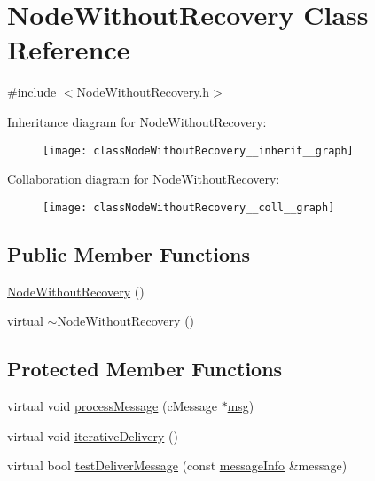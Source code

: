 \hypertarget{classNodeWithoutRecovery}{}\section{Node\+Without\+Recovery Class Reference}
\label{classNodeWithoutRecovery}


{\ttfamily \#include $<$Node\+Without\+Recovery.\+h$>$}



Inheritance diagram for Node\+Without\+Recovery\+:\nopagebreak
\begin{figure}[H]
\begin{center}
\leavevmode
\texttt{[image: classNodeWithoutRecovery\_\_inherit\_\_graph]}
\end{center}
\end{figure}


Collaboration diagram for Node\+Without\+Recovery\+:\nopagebreak
\begin{figure}[H]
\begin{center}
\leavevmode
\texttt{[image: classNodeWithoutRecovery\_\_coll\_\_graph]}
\end{center}
\end{figure}
\subsection*{Public Member Functions}
\begin{DoxyCompactItemize}
\item 
\hyperlink{classNodeWithoutRecovery_a81c3fab3d91ae3bd6496b876d16694d8}{Node\+Without\+Recovery} ()
\item 
virtual \hyperlink{classNodeWithoutRecovery_a2690cfda5b6d9998ee873babb3418870}{$\sim$\+Node\+Without\+Recovery} ()
\end{DoxyCompactItemize}
\subsection*{Protected Member Functions}
\begin{DoxyCompactItemize}
\item 
virtual void \hyperlink{classNodeWithoutRecovery_a0b44132b4ebc650399711766cb050399}{process\+Message} (c\+Message $\ast$\hyperlink{Controller_8h_afa0f3b802fbc219228f7bb97996fa558}{msg})
\item 
virtual void \hyperlink{classNodeWithoutRecovery_a65e21db6d6b4e72b898fd567f8b4aee2}{iterative\+Delivery} ()
\item 
virtual bool \hyperlink{classNodeWithoutRecovery_a8cf83ec6d0af26e385dcde0bc03f5b6d}{test\+Deliver\+Message} (const \hyperlink{structures_8h_a7e7bdc1d2fff8a9436f2f352b2711ed6}{message\+Info} \&message)
\end{DoxyCompactItemize}
